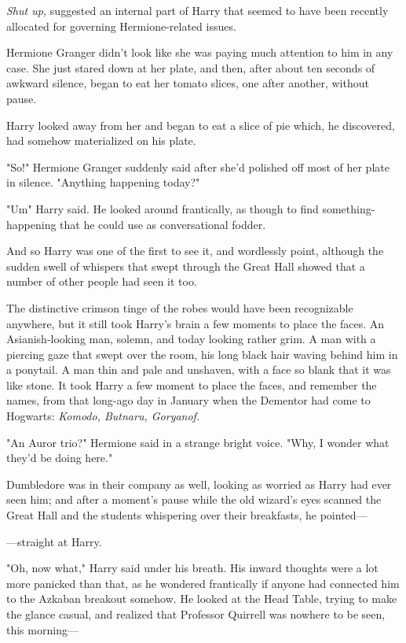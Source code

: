 \emph{Shut up,} suggested an internal part of Harry that seemed to have been
recently allocated for governing Hermione-related issues.

Hermione Granger didn't look like she was paying much attention to him in any
case. She just stared down at her plate, and then, after about ten seconds of
awkward silence, began to eat her tomato slices, one after another, without
pause.

Harry looked away from her and began to eat a slice of pie which, he
discovered, had somehow materialized on his plate.

"So!" Hermione Granger suddenly said after she'd polished off most of her plate
in silence. "Anything happening today?"

"Um{\el}" Harry said. He looked around frantically, as though to find
something-happening that he could use as conversational fodder.

And so Harry was one of the first to see it, and wordlessly point, although the
sudden swell of whispers that swept through the Great Hall showed that a number
of other people had seen it too.

The distinctive crimson tinge of the robes would have been recognizable
anywhere, but it still took Harry's brain a few moments to place the faces. An
Asianish-looking man, solemn, and today looking rather grim. A man with a
piercing gaze that swept over the room, his long black hair waving behind him
in a ponytail. A man thin and pale and unshaven, with a face so blank that it
was like stone. It took Harry a few moment to place the faces, and remember the
names, from that long-ago day in January when the Dementor had come to
Hogwarts: \emph{Komodo, Butnaru, Goryanof.}

"An Auror trio?" Hermione said in a strange bright voice. "Why, I wonder what
they'd be doing here."

Dumbledore was in their company as well, looking as worried as Harry had ever
seen him; and after a moment's pause while the old wizard's eyes scanned the
Great Hall and the students whispering over their breakfasts, he pointed—

—straight at Harry.

"Oh, now what," Harry said under his breath. His inward thoughts were a lot
more panicked than that, as he wondered frantically if anyone had connected him
to the Azkaban breakout somehow. He looked at the Head Table, trying to make
the glance casual, and realized that Professor Quirrell was nowhere to be seen,
this morning—

